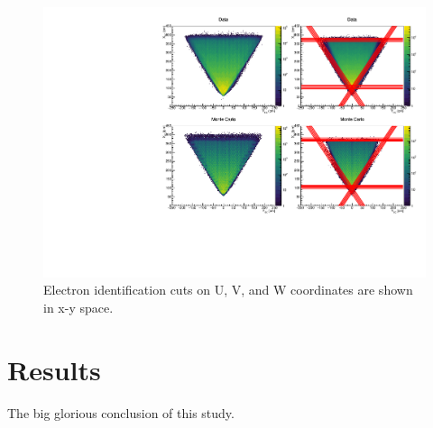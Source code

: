 \begin{figure}
  \centering
  \label{fig:systematics-ec-fid}
  \includegraphics[width=\textwidth]{image/plots/sidis/systematics/ec_fid_sect1.pdf}
  \caption[Variation of EC U, V, and W cuts used to identify electrons.]{Electron identification cuts on U, V, and W coordinates are shown in x-y space.}
\end{figure}

\section{Results}
The big glorious conclusion of this study.